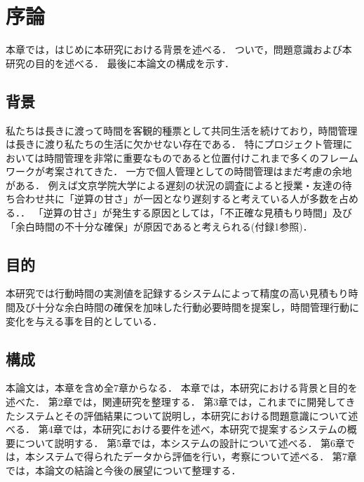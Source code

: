 \chapter{序論}
本章では，はじめに本研究における背景を述べる．
ついで，問題意識および本研究の目的を述べる．
最後に本論文の構成を示す．

\section{背景}

私たちは長きに渡って時間を客観的種票として共同生活を続けており\cite{history}，時間管理は長きに渡り私たちの生活に欠かせない存在である．
特にプロジェクト管理においては時間管理を非常に重要なものであると位置付けこれまで多くのフレームワークが考案されてきた．
一方で個人管理としての時間管理はまだ考慮の余地がある．
例えば文京学院大学による遅刻の状況の調査によると授業・友達の待ち合わせ共に「逆算の甘さ」が一因となり遅刻すると考えている人が多数を占める．\cite{bunkyo}．
「逆算の甘さ」が発生する原因としては，「不正確な見積もり時間」及び「余白時間の不十分な確保」が原因であると考えられる(付録1参照)．

\section{目的}
本研究では行動時間の実測値を記録するシステムによって精度の高い見積もり時間及び十分な余白時間の確保を加味した行動必要時間を提案し，時間管理行動に変化を与える事を目的としている．

\section{構成}
本論文は，本章を含め全7章からなる．
本章では，本研究における背景と目的を述べた．
第2章では，関連研究を整理する．
第3章では，これまでに開発してきたシステムとその評価結果について説明し，本研究における問題意識について述べる．
第4章では，本研究における要件を述べ，本研究で提案するシステムの概要について説明する．
第5章では，本システムの設計について述べる．
第6章では，本システムで得られたデータから評価を行い，考察について述べる．
第7章では，本論文の結論と今後の展望について整理する．
